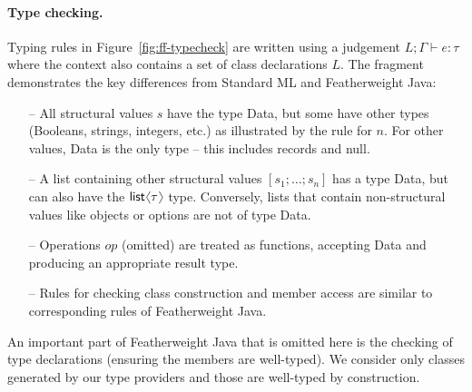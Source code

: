 \documentclass[10pt,preprint,blind,clearpagebib]{sigplanconf}
\newcommand{\langl}{\begin{picture}(4.5,7)
\put(1.1,2.5){\rotatebox{60}{\line(1,0){5.5}}}
\put(1.1,2.5){\rotatebox{300}{\line(1,0){5.5}}}
\end{picture}}
\newcommand{\rangl}{\begin{picture}(4.5,7)
\put(.9,2.5){\rotatebox{120}{\line(1,0){5.5}}}
\put(.9,2.5){\rotatebox{240}{\line(1,0){5.5}}}
\end{picture}}
\newcommand{\kvd}[1]{\textnormal{\textcolor{kvdclr}{\sffamily #1}}}
\newcommand{\ident}[1]{\textnormal{\sffamily #1}}
\begin{document}
\paragraph{Type checking.} 
Typing rules in Figure~\ref{fig:ff-typecheck} are written using a judgement
$L; \Gamma \vdash e : \tau$ where the context also contains a set of class declarations $L$.
The fragment demonstrates the key differences from Standard ML and Featherweight Java:
%
\begin{itemize}
\item[--] All structural values $s$ have the type \ident{Data}, but some have other types
  (Booleans, strings, integers, etc.) as illustrated by the rule for $n$.
  For other values, \ident{Data} is the only type -- this includes records and \kvd{null}.
\item[--] A list containing other structural values $[s_1; \ldots; s_n]$ has a type \ident{Data},
  but can also have the $\ident{list}\langl\tau\rangl$ type. Conversely, lists that contain
  non-structural values like objects or options are not of type \ident{Data}.
\item[--] Operations $op$ (omitted) are treated as functions, accepting 
  \ident{Data} and producing an appropriate result type.
\item[--] Rules for checking class construction and member access are similar to corresponding
  rules of Featherweight Java.  
\end{itemize}
%
An important part of Featherweight Java that is omitted here is the checking of type declarations
(ensuring the members are well-typed). We consider only classes generated by our type providers 
and those are well-typed by construction.

\end{document}
